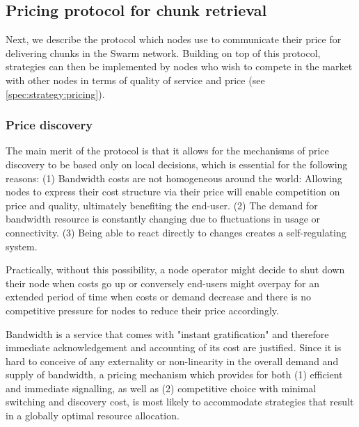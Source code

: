 \subsection{Pricing protocol for chunk retrieval\statusgreen}\label{sec:pricing}

\green{}

Next, we describe the protocol which nodes use to communicate their price for delivering chunks in the Swarm network. Building on top of this protocol, strategies can then be implemented by nodes who wish to compete in the market with other nodes in terms of quality of service and price (see \ref{spec:strategy:pricing}). 

\subsubsection{Price discovery}\label{sec:retrieval-price-discovery}

The main merit of the protocol is that it allows for the mechanisms of price discovery to be based only on local decisions, which is essential for the following reasons: (1) Bandwidth costs are not homogeneous around the world: Allowing nodes to express their cost structure via their price will enable competition on price and quality, ultimately benefiting the end-user. (2) The demand for bandwidth resource is constantly changing due to fluctuations in usage or connectivity. (3) Being able to react directly to changes creates a self-regulating system. 

Practically, without this possibility, a node operator might decide to shut down their node when costs go up or conversely end-users might overpay for an extended period of time when costs or demand decrease and there is no competitive pressure for nodes to reduce their price accordingly. 

Bandwidth is a service that comes with "instant gratification" and therefore immediate acknowledgement and accounting of its cost are justified. Since it is hard to conceive of any externality or non-linearity in the overall demand and supply of bandwidth, a pricing mechanism which provides for both (1) efficient and immediate signalling, as well as (2) competitive choice with minimal switching and discovery cost, is most likely to accommodate strategies that result in a globally optimal resource allocation.

